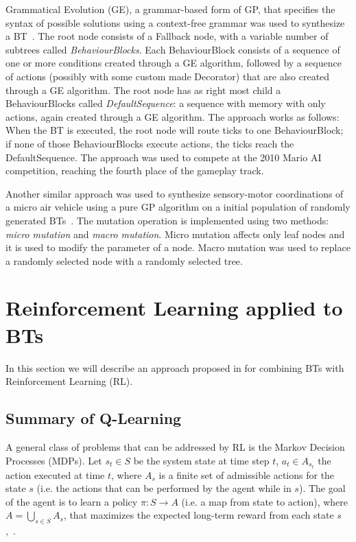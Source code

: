 Grammatical Evolution (GE), a grammar-based form of GP, that specifies the syntax of possible solutions using a context-free grammar was used to synthesize a BT~\cite{perez2011evo}. The root node consists of a Fallback node, with a variable number
of subtrees called \emph{BehaviourBlocks}. Each BehaviourBlock consists of a sequence of one or more conditions created through a GE algorithm,
followed by a sequence of actions (possibly with some custom made Decorator) that are also created through a GE algorithm. The root node has as right most child a BehaviourBlocks called \emph{DefaultSequence}: a sequence with memory with only actions, again created through a GE algorithm. The approach works as follows: When the BT is executed, the root node will
route ticks to one BehaviourBlock; if none of those BehaviourBlocks execute actions, the ticks reach the DefaultSequence. The approach was used to compete at the 2010 Mario AI competition, reaching the fourth place of the gameplay track. 

Another similar approach was used to synthesize sensory-motor coordinations of a micro air vehicle using a pure GP algorithm on a initial population of randomly generated BTs~\cite{scheper2014}. The mutation operation is implemented using two methods: \emph{micro mutation} and \emph{macro mutation}. Micro mutation affects only leaf nodes and it is used to modify the parameter of a node. Macro mutation was used to replace a randomly selected node with a randomly selected tree.





\section{Reinforcement Learning applied to BTs}
\label{sec:rl}
In this section we will describe an approach proposed in \cite{pereira2015framework} for combining BTs with Reinforcement Learning (RL).

\subsection{Summary of Q-Learning}
A general class of problems that can be addressed by RL is the
Markov Decision Processes (MDPs). 
Let $s_t \in S$ be the system state at time step $t$, $a_t \in {A}_{s_t}$ the action executed at time $t$, where ${A}_s$ is a finite set of admissible actions for the state $s$ (i.e. the actions that can be performed by the agent while in $s$). The goal of the agent is to learn a policy $\pi : {S} \to {A}$ (i.e. a map from state to  action), where $A = \bigcup_{s \in {S}}{A}_s$, that maximizes the expected long-term reward from each state $s$,~\cite{sutton1999}.
 
